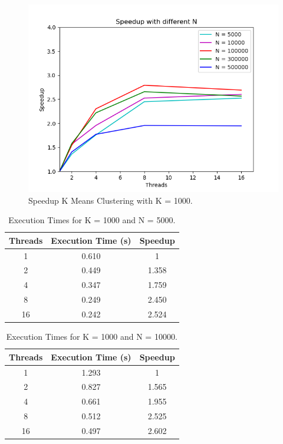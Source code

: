 \documentclass[10pt,twocolumn,letterpaper]{article}
\begin{document}
\begin{figure}[H]
	\includegraphics[width=\linewidth]{images/speedup_by_n.png}
	\caption{Speedup K Means Clustering with K = 1000.}
	\label{fig:speedup_n}
\end{figure}

\begin{table}[H]
	\begin{center}
		\begin{tabular}{|c|c|c|}
			\hline
			Threads & Execution Time (s) & Speedup \\
			\hline
			1 & 0.610 & 1 \\ 
			2 & 0.449 & 1.358 \\
			4 & 0.347 & 1.759 \\
			8 & 0.249 & 2.450 \\ 
			16 & 0.242 & 2.524 \\
			\hline
		\end{tabular}
	\end{center}
	\caption{Execution Times for K = 1000 and N = 5000.}
	\label{tab:speedup_k_n_5}
\end{table}

\begin{table}[H]
	\begin{center}
		\begin{tabular}{|c|c|c|}
			\hline
			Threads & Execution Time (s) & Speedup \\
			\hline
			1 & 1.293 & 1 \\ 
			2 & 0.827 & 1.565 \\
			4 & 0.661 & 1.955 \\
			8 & 0.512 & 2.525 \\ 
			16 & 0.497 & 2.602 \\
			\hline
		\end{tabular}
	\end{center}
	\caption{Execution Times for K = 1000 and N = 10000.}
	\label{tab:speedup_k_n_6}
\end{table}
\end{document}
